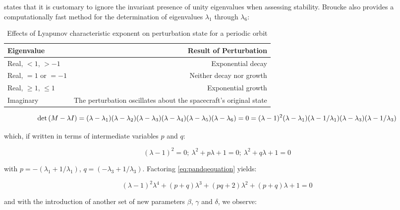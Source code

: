 \noindent \citep{broucke1968} states that it is customary to ignore the invariant presence of unity eigenvalues when assessing stability. Broucke also provides a computationally fast method for the determination of eigenvalues $\lambda_1$ through $\lambda_6$:

\begin{table}[h]\label{tbl:lyapunovexponent}
\centering
\begin{tabular}{l r}
\toprule
\toprule
\textbf{Eigenvalue} & \textbf{Result of Perturbation} \\ \toprule
Real, $< 1$, $> -1$ & Exponential decay \\
Real, $=1$ or $=-1$ & Neither decay nor growth\\
Real, $\geq 1$, $\leq 1$ & Exponential growth\\
Imaginary & The perturbation oscillates about the spacecraft's original state \\
\bottomrule
\bottomrule
\end{tabular}
\caption{Effects of Lyapunov characteristic exponent on perturbation state for a periodic orbit}
\end{table}

\begin{equation}
\textnormal{det}\left(M - \lambda I\right) = \\ (\lambda - \lambda_1)(\lambda - \lambda_2)(\lambda - \lambda_3)(\lambda - \lambda_4)(\lambda - \lambda_5)(\lambda - \lambda_6) = 0 = (\lambda - 1)^2 ( \lambda - \lambda_1)(\lambda-1/\lambda_1)(\lambda-\lambda_3)(\lambda - 1/\lambda_3)
\end{equation}

\noindent which, if written in terms of intermediate variables $p$ and $q$:

\begin{equation}\label{eq:pandqequation}
(\lambda - 1)^2 = 0;~\lambda^2 + p\lambda + 1 = 0;~\lambda^2 + q\lambda + 1 = 0
\end{equation}

\noindent with $p = -(\lambda_1 + 1/\lambda_1)$, $q = (-\lambda_3 + 1/\lambda_3)$. Factoring \ref{eq:pandqequation} yields:

\begin{equation}\label{eq:factoredpandq}
(\lambda-1)^2\lambda^4 + (p+q)\lambda^3 + (pq+2)\lambda^2 + (p+q)\lambda + 1 = 0
\end{equation}

\noindent and with the introduction of another set of new parameters $\beta$, $\gamma$ and $\delta$, we observe:

